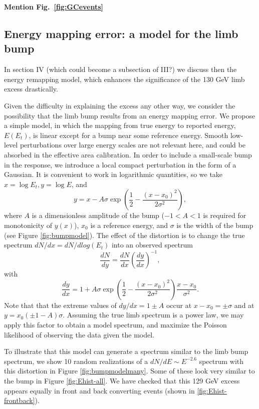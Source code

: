 \documentclass[aps,twocolumn,prd,superscriptaddress,showpacs,nofootinbib,fixfloat]{revtex4}
\newcommand{\be}{\begin{equation}}
\newcommand{\ee}{\end{equation}}
\begin{document}
\textbf{Mention Fig.~\ref{fig:GCevents}}


\subsection{Energy mapping error: a model for the limb bump}
In section IV (which could become a subsection
of III?) we discuss then the energy remapping model, which enhances the
significance of the 130 GeV limb excess drastically.


Given the difficulty in explaining the excess any other way, we consider the
possibility that the limb bump results from an energy mapping error.  We
propose a simple model, in which the mapping from true energy to reported
energy, $E(E_t)$, is linear except for a bump near some reference energy.
Smooth low-level perturbations over large energy scales are not relevant here,
and could be absorbed in the effective area calibration.  In order to include
a small-scale bump in the response, we introduce a local compact perturbation
in the form of a Gaussian.  It is convenient to work in logarithmic
quantities, so we take $x=\log E_t, y=\log E$, and
\be
\label{eq:yofx}
y=x - A\sigma \exp\left(\frac{1}{2}-\frac{(x-x_0)^2}{2\sigma^2}\right),
\ee
where $A$ is a dimensionless amplitude of the bump ($-1<A<1$ is required
for monotonicity of $y(x)$), $x_0$ is a reference energy, and $\sigma$ is the
width of the bump (see Figure \ref{fig:bumpmodel}).
The effect of the distortion is to change the true spectrum $dN/dx =
dN/dlog(E_t)$ into an observed spectrum
\be
\label{eq:dndy}
\frac{dN}{dy} = \frac{dN}{dx} \left(\frac{dy}{dx}\right)^{-1} ,
\ee
with
\be
\label{eq:dydx}
\frac{dy}{dx} = 1 + A\sigma \exp\left(\frac{1}{2}-\frac{(x-x_0)^2}{2\sigma^2}\right)
\frac{x-x_0}{\sigma^2}.
\ee
Note that that the extreme values of $dy/dx = 1 \pm A$ occur at $x-x_0 = \pm
\sigma$ and at $y=x_0(\pm1-A)\sigma$.  Assuming the true limb spectrum is a
power law, we may apply this factor to obtain a model spectrum, and maximize
the Poisson likelihood of observing the data given the model.

To illustrate that this model can generate a spectrum
similar to the limb bump spectrum, we show 10 random
realizations of a $dN/dE \sim E^{-2.6}$ spectrum with this
distortion in Figure \ref{fig:bumpmodelmany}.  Some of these
look very similar to the bump in Figure
\ref{fig:Ehist-all}. We have checked that this 129 GeV
excess appears equally in front and back converting events
(shown in \ref{fig:Ehist-frontback}).
\end{document}

